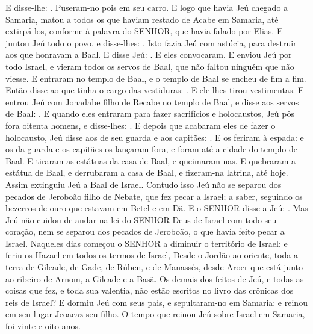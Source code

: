 {  E disse-lhe: . Puseram-no pois em seu carro.
  E logo que havia Jeú chegado a Samaria, matou a todos os que haviam restado de Acabe em Samaria, até extirpá-los, conforme à palavra do SENHOR, que havia falado por Elias.
  E juntou Jeú todo o povo, e disse-lhes: . Isto fazia Jeú com astúcia, para destruir aos que honravam a Baal.
  E disse Jeú: . E eles convocaram.
  E enviou Jeú por todo Israel, e vieram todos os servos de Baal, que não faltou ninguém que não viesse. E entraram no templo de Baal, e o templo de Baal se encheu de fim a fim.
  Então disse ao que tinha o cargo das vestiduras: . E ele lhes tirou vestimentas.
  E entrou Jeú com Jonadabe filho de Recabe no templo de Baal, e disse aos servos de Baal: .
  E quando eles entraram para fazer sacrifícios e holocaustos, Jeú pôs fora oitenta homens, e disse-lhes: .
  E depois que acabaram eles de fazer o holocausto, Jeú disse aos de seu guarda e aos capitães: . E os feriram à espada: e os da guarda e os capitães os lançaram fora, e foram até a cidade do templo de Baal.
  E tiraram as estátuas da casa de Baal, e queimaram-nas.
  E quebraram a estátua de Baal, e derrubaram a casa de Baal, e fizeram-na latrina, até hoje.
  Assim extinguiu Jeú a Baal de Israel.
  Contudo isso Jeú não se separou dos pecados de Jeroboão filho de Nebate, que fez pecar a Israel; a saber, seguindo os bezerros de ouro que estavam em Betel e em Dã.
  E o SENHOR disse a Jeú: .
  Mas Jeú não cuidou de andar na lei do SENHOR Deus de Israel com todo seu coração, nem se separou dos pecados de Jeroboão, o que havia feito pecar a Israel.
  Naqueles dias começou o SENHOR a diminuir o território de Israel: e feriu-os Hazael em todos os termos de Israel,
  Desde o Jordão ao oriente, toda a terra de Gileade, de Gade, de Rúben, e de Manassés, desde Aroer que está junto ao ribeiro de Arnom, a Gileade e a Basã.
  Os demais dos feitos de Jeú, e todas as coisas que fez, e toda sua valentia, não estão escritos no livro das crônicas dos reis de Israel?
  E dormiu Jeú com seus pais, e sepultaram-no em Samaria: e reinou em seu lugar Jeoacaz seu filho.
  O tempo que reinou Jeú sobre Israel em Samaria, foi vinte e oito anos.
\par }

